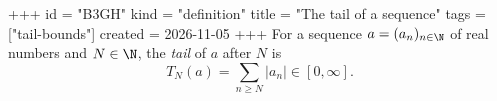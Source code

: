 +++
id = "B3GH"
kind = "definition"
title = "The tail of a sequence"
tags = ["tail-bounds"]
created = 2026-11-05
+++
For a sequence $a = (a_n)_{n \in \N}$ of real numbers and $N \in \N$, the \emph{tail} of $a$ after $N$ is
\[
  T_N(a) = \sum_{n \ge N} |a_n| \in [0, \infty].
\]
